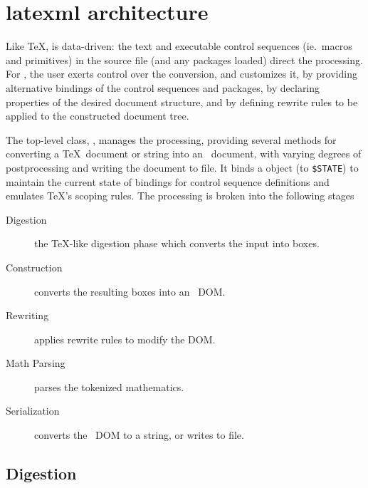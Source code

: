 \documentclass{book}
\newcommand{\ltxcode}{\lstinline[style=latexml]}
\begin{document}
\section{latexml architecture}\label{latexmlarchitecture}
%
Like \TeX,  is data-driven: the text and executable control
sequences (ie.~macros and primitives)
in the source file (and any packages loaded) direct the processing.
For \LaTeXML, the user exerts control over the conversion, and customizes it, by 
providing alternative bindings of the control sequences and packages,
by declaring properties of the desired document structure,
and by defining rewrite rules to be applied to the constructed document tree.

The top-level class, , manages the processing, providing several methods
for converting a \TeX\ document or string into an \XML\ document, with varying degrees
of postprocessing and writing the document to file.
It binds a  object (to \ltxcode|$STATE|) to maintain the current state
of bindings for control sequence definitions and emulates \TeX's scoping rules.
The processing is broken into the following stages
\begin{description}
   \item[Digestion] the \TeX-like digestion phase which converts the input into boxes.
   \item[Construction] converts the resulting boxes into an \XML\ DOM.
   \item[Rewriting] applies rewrite rules to modify the DOM.
   \item[Math Parsing] parses the tokenized mathematics.
   \item[Serialization] converts the \XML\ DOM to a string, or writes to file.
\end{description}

\subsection{Digestion}\label{architecture.digestion}
%
%
%
%
%
%
%
%
%
%
%
\end{document}
